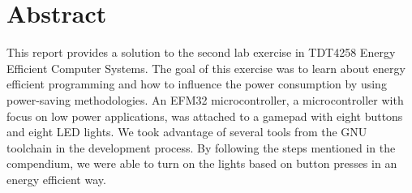 \section{Abstract}

This report provides a solution to the second lab exercise in TDT4258 Energy Efficient Computer Systems.
The goal of this exercise was to learn about energy efficient programming and how to influence the power consumption by using power-saving methodologies.
An EFM32 microcontroller, a microcontroller with focus on low power applications, was attached to a gamepad with eight buttons and eight LED lights. We took advantage of several tools from the GNU toolchain in the development process. By following the steps mentioned in the compendium\cite{eeds-compendium}, we were able to turn on the lights based on button presses in an energy efficient way.
